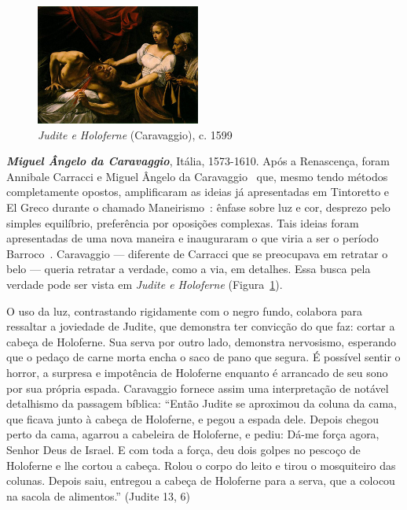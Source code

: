 \begin{figure}
  \begin{center}
    \includegraphics[width=0.48\textwidth]{figs/caravaggio_judite.png}
  \end{center}
  \caption{\emph{Judite e Holoferne} (Caravaggio), c. 1599}
  \label{fig:caravaggio:judite}
\end{figure}

\textbf{\emph{Miguel Ângelo da Caravaggio}}, Itália, 1573-1610.  Após
a Renascença, foram Annibale Carracci e Miguel Ângelo da
Caravaggio~\cite{bayer} que, mesmo tendo métodos completamente
opostos, amplificaram as ideias já apresentadas em Tintoretto e El
Greco durante o chamado Maneirismo~\cite{tatarkiewicz}: ênfase sobre
luz e cor, desprezo pelo simples equilíbrio, preferência por oposições
complexas. Tais ideias foram apresentadas de uma nova maneira e
inauguraram o que viria a ser o período
Barroco~\cite{hills}. Caravaggio --- diferente de Carracci que se
preocupava em retratar o belo --- queria retratar a verdade, como a
via, em detalhes. Essa busca pela verdade pode ser vista em
\emph{Judite e Holoferne}
(Figura~\ref{fig:caravaggio:judite}).~\cite{puglisi,caravaggio}

O uso da luz, contrastando rigidamente com o negro fundo, colabora
para ressaltar a joviedade de Judite, que demonstra ter convicção do
que faz: cortar a cabeça de Holoferne. Sua serva por outro lado,
demonstra nervosismo, esperando que o pedaço de carne morta encha o
saco de pano que segura. É possível sentir o horror, a surpresa e
impotência de Holoferne enquanto é arrancado de seu sono por sua
própria espada. Caravaggio fornece assim uma interpretação de notável
detalhismo da passagem bíblica: ``Então Judite se aproximou da coluna
da cama, que ficava junto à cabeça de Holoferne, e pegou a espada
dele. Depois chegou perto da cama, agarrou a cabeleira de Holoferne, e
pediu: Dá-me força agora, Senhor Deus de Israel. E com toda a força,
deu dois golpes no pescoço de Holoferne e lhe cortou a cabeça. Rolou o
corpo do leito e tirou o mosquiteiro das colunas. Depois saiu,
entregou a cabeça de Holoferne para a serva, que a colocou na sacola
de alimentos.'' (Judite 13, 6)

